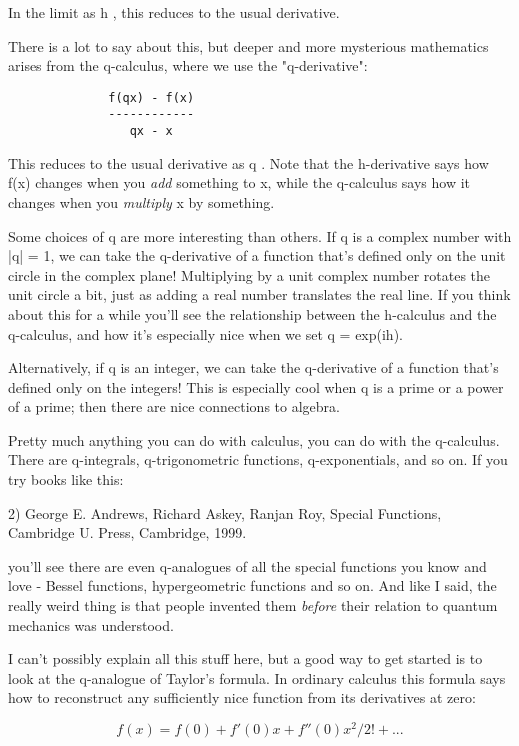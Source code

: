 In the limit as h , this reduces to the usual derivative.


There is a lot to say about this, but deeper and more mysterious
mathematics arises from the q-calculus, where we use the
"q-derivative":

\begin{verbatim}
              f(qx) - f(x)
              ------------
                 qx - x
\end{verbatim}
    
This reduces to the usual derivative as q .  Note that the
h-derivative says how f(x) changes when you \emph{add} something to x, while
the q-calculus says how it changes when you \emph{multiply} x by something.

Some choices of q are more interesting than others.   If q is a complex
number with |q| = 1, we can take the q-derivative of a function that's
defined only on the unit circle in the complex plane!  Multiplying by a
unit complex number rotates the unit circle a bit, just as adding a real
number translates the real line.   If you think about this for a while
you'll see the relationship between the h-calculus and the q-calculus, 
and how it's especially nice when we set q = exp(ih).

Alternatively, if q is an integer, we can take the q-derivative of a
function that's defined only on the integers!  This is especially cool
when q is a prime or a power of a prime; then there are nice connections
to algebra.

Pretty much anything you can do with calculus, you can do with the
q-calculus.  There are q-integrals, q-trigonometric functions, 
q-exponentials, and so on.   If you try books like this:

2) George E. Andrews, Richard Askey, Ranjan Roy, Special Functions,
Cambridge U. Press, Cambridge, 1999.

you'll see there are even q-analogues of all the special functions you
know and love - Bessel functions, hypergeometric functions and so on. 
And like I said, the really weird thing is that people invented them
\emph{before} their relation to quantum mechanics was understood.

I can't possibly explain all this stuff here, but a good way to get
started is to look at the q-analogue of Taylor's formula.  In ordinary
calculus this formula says how to reconstruct any sufficiently nice
function from its derivatives at zero:

$$
f(x) = f(0) + f'(0) x + f''(0) x^{2}/2! + ... 
$$
    
